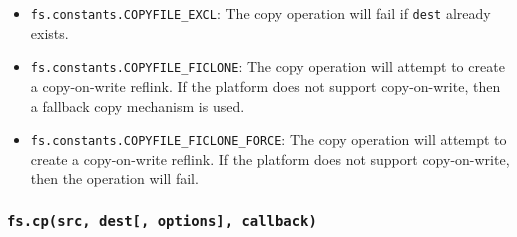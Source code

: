 \begin{itemize}
\tightlist
\item
  \texttt{fs.constants.COPYFILE\_EXCL}: The copy operation will fail if
  \texttt{dest} already exists.
\item
  \texttt{fs.constants.COPYFILE\_FICLONE}: The copy operation will
  attempt to create a copy-on-write reflink. If the platform does not
  support copy-on-write, then a fallback copy mechanism is used.
\item
  \texttt{fs.constants.COPYFILE\_FICLONE\_FORCE}: The copy operation
  will attempt to create a copy-on-write reflink. If the platform does
  not support copy-on-write, then the operation will fail.
\end{itemize}

\begin{Shaded}
\begin{Highlighting}[]
\OperatorTok{,} \OperatorTok{;}

 
  \OperatorTok{;}
  \NormalTok{(}\NormalTok{)}\OperatorTok{;}
\NormalTok{\}}

\NormalTok{(}\OperatorTok{,} \OperatorTok{,}\OperatorTok{;}

\NormalTok{(}\OperatorTok{,} \OperatorTok{,}\OperatorTok{,}\OperatorTok{;}
\end{Highlighting}
\end{Shaded}

\subsubsection{\texorpdfstring{\texttt{fs.cp(src,\ dest{[},\ options{]},\ callback)}}{fs.cp(src, dest{[}, options{]}, callback)}}\label{fs.cpsrc-dest-options-callback}

